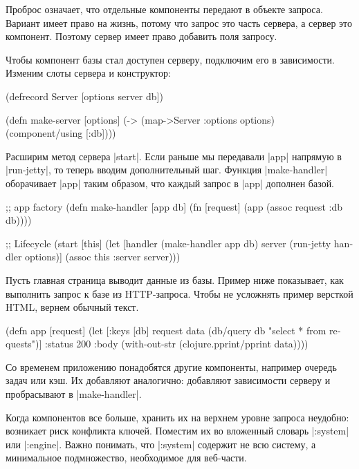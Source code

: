 Проброс означает, что отдельные компоненты передают в объекте запроса. Вариант
имеет право на жизнь, потому что запрос это часть сервера, а сервер это
компонент. Поэтому сервер имеет право добавить поля запросу.

Чтобы компонент базы стал доступен серверу, подключим его в зависимости. Изменим
слоты сервера и конструктор:

\begin{english}
  \begin{clojure}
(defrecord Server
  [options server db])

(defn make-server
  [options]
  (-> (map->Server {:options options})
      (component/using [:db])))
  \end{clojure}
\end{english}

Расширим метод сервера \spverb|start|. Если раньше мы передавали \spverb|app|
напрямую в \spverb|run-jetty|, то теперь вводим дополнительный шаг. Функция
\spverb|make-handler| оборачивает \spverb|app| таким образом, что каждый запрос
в \spverb|app| дополнен базой.

\begin{english}
  \begin{clojure}
;; app factory
(defn make-handler [app db]
  (fn [request]
    (app (assoc request :db db))))

;; Lifecycle
(start [this]
  (let [handler (make-handler app db)
        server (run-jetty handler options)]
    (assoc this :server server)))
  \end{clojure}
\end{english}

Пусть главная страница выводит данные из базы. Пример ниже показывает, как
выполнить запрос к базе из HTTP-запроса. Чтобы не усложнять пример версткой
HTML, вернем обычный текст.

\begin{english}
  \begin{clojure}
(defn app [request]
  (let [{:keys [db]} request
        data (db/query db "select * from requests")]
    {:status 200
     :body (with-out-str
             (clojure.pprint/pprint data))}))
  \end{clojure}
\end{english}

Со временем приложению понадобятся другие компоненты, например очередь задач или
кэш. Их добавляют аналогично: добавляют зависимости серверу и пробрасывают в
\spverb|make-handler|.

Когда компонентов все больше, хранить их на верхнем уровне запроса неудобно:
возникает риск конфликта ключей. Поместим их во вложенный словарь
\spverb|:system| или \spverb|:engine|. Важно понимать, что \spverb|:system|
содержит не всю систему, а минимальное подмножество, необходимое для веб-части.


